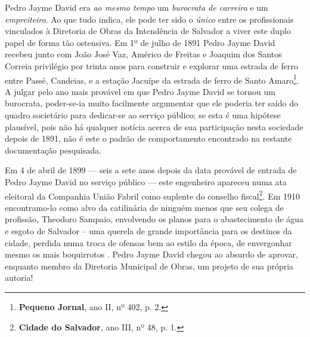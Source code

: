 Pedro Jayme David era \textit{ao mesmo tempo} um \textit{burocrata de carreira} e um \textit{empreiteiro}. Ao que tudo indica, ele pode ter sido o \textit{único} entre os profissionais vinculados à Diretoria de Obras da Intendência de Salvador a viver este duplo papel de forma tão ostensiva. Em 1º de julho de 1891 Pedro Jayme David recebeu junto com João José Vaz, Américo de Freitas e Joaquim dos Santos Correia privilégio por trinta anos para construir e explorar uma estrada de ferro entre Passé, Candeias, e a estação Jacuípe da estrada de ferro de Santo Amaro\footnote{\textbf{Pequeno Jornal}, ano II, nº 402, p. 2.}. A julgar pelo ano mais provável em que Pedro Jayme David se tornou um burocrata, poder-se-ia muito facilmente argumentar que ele poderia ter saído do quadro societário para dedicar-se ao serviço público; se esta é uma hipótese plausível, pois não há qualquer notícia acerca de sua participação nesta sociedade depois de 1891, não é este o padrão de comportamento encontrado na restante documentação pesquisada. 

Em 4 de abril de 1899 --- seis a sete anos depois da data provável de entrada de Pedro Jayme David no serviço público --- este engenheiro apareceu numa ata eleitoral da Companhia União Fabril como suplente do conselho fiscal\footnote{\textbf{Cidade do Salvador}, ano III, nº 48, p. 1.}. Em 1910 encontramo-lo como alvo da catilinária de ninguém menos que seu colega de profissão, Theodoro Sampaio, envolvendo os planos para o abastecimento de água e esgoto de Salvador – uma querela de grande importância para os destinos da cidade, perdida numa troca de ofensas bem ao estilo da época, de envergonhar mesmo os mais boquirrotos \cite{sampaio_agua_1910}. Pedro
Jayme David chegou ao absurdo de aprovar, enquanto membro da Diretoria Municipal de Obras, um projeto de sua própria autoria!

